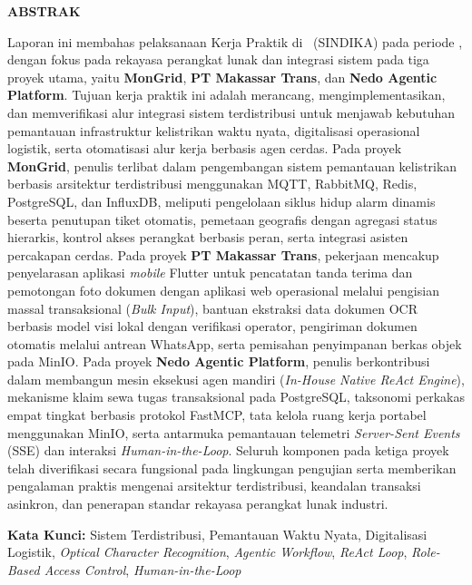 \cleardoublepage
{}
{}
\begin{center}
  {\fontsize{12}{15}\bfseries ABSTRAK\par}
\end{center}
\vspace{12pt}

Laporan ini membahas pelaksanaan Kerja Praktik di \NamaPerusahaan\ (SINDIKA) pada periode \PeriodeKP, dengan fokus pada rekayasa perangkat lunak dan integrasi sistem pada tiga proyek utama, yaitu \textbf{MonGrid}, \textbf{PT Makassar Trans}, dan \textbf{Nedo Agentic Platform}. Tujuan kerja praktik ini adalah merancang, mengimplementasikan, dan memverifikasi alur integrasi sistem terdistribusi untuk menjawab kebutuhan pemantauan infrastruktur kelistrikan waktu nyata, digitalisasi operasional logistik, serta otomatisasi alur kerja berbasis agen cerdas. Pada proyek \textbf{MonGrid}, penulis terlibat dalam pengembangan sistem pemantauan kelistrikan berbasis arsitektur terdistribusi menggunakan MQTT, RabbitMQ, Redis, PostgreSQL, dan InfluxDB, meliputi pengelolaan siklus hidup alarm dinamis beserta penutupan tiket otomatis, pemetaan geografis dengan agregasi status hierarkis, kontrol akses perangkat berbasis peran, serta integrasi asisten percakapan cerdas. Pada proyek \textbf{PT Makassar Trans}, pekerjaan mencakup penyelarasan aplikasi \textit{mobile} Flutter untuk pencatatan tanda terima dan pemotongan foto dokumen dengan aplikasi web operasional melalui pengisian massal transaksional (\textit{Bulk Input}), bantuan ekstraksi data dokumen OCR berbasis model visi lokal dengan verifikasi operator, pengiriman dokumen otomatis melalui antrean WhatsApp, serta pemisahan penyimpanan berkas objek pada MinIO. Pada proyek \textbf{Nedo Agentic Platform}, penulis berkontribusi dalam membangun mesin eksekusi agen mandiri (\textit{In-House Native ReAct Engine}), mekanisme klaim sewa tugas transaksional pada PostgreSQL, taksonomi perkakas empat tingkat berbasis protokol FastMCP, tata kelola ruang kerja portabel menggunakan MinIO, serta antarmuka pemantauan telemetri \textit{Server-Sent Events} (SSE) dan interaksi \textit{Human-in-the-Loop}. Seluruh komponen pada ketiga proyek telah diverifikasi secara fungsional pada lingkungan pengujian serta memberikan pengalaman praktis mengenai arsitektur terdistribusi, keandalan transaksi asinkron, dan penerapan standar rekayasa perangkat lunak industri.

\vspace{0.8cm}
\noindent\textbf{Kata Kunci:} Sistem Terdistribusi, Pemantauan Waktu Nyata, Digitalisasi Logistik, \textit{Optical Character Recognition}, \textit{Agentic Workflow}, \textit{ReAct Loop}, \textit{Role-Based Access Control}, \textit{Human-in-the-Loop}
